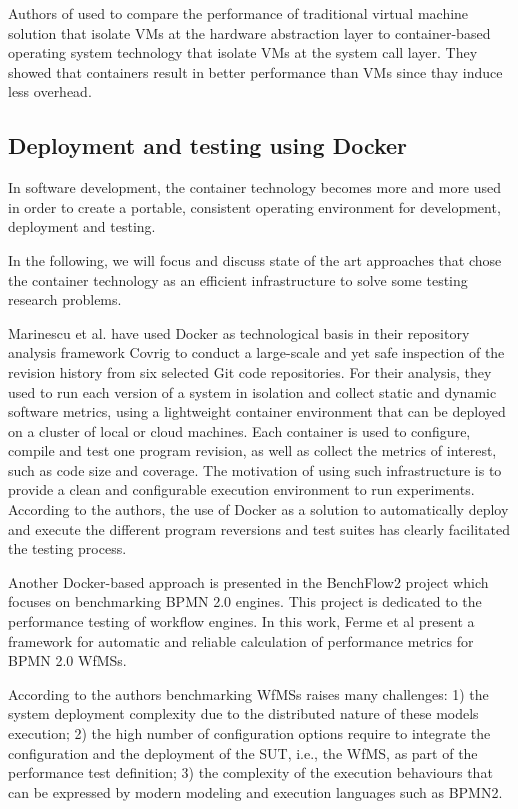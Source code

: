 Authors of \cite{spoiala2016performance,soltesz2007container,merkel2014docker,felter2015updated} used to compare the performance of traditional virtual machine solution that isolate VMs at the hardware abstraction layer to container-based operating system technology that isolate VMs at the system call layer. They showed that containers result in better performance than VMs since thay induce less overhead. 

\subsection{Deployment and testing using Docker}  
In software development, the container technology becomes more and more used in order to create a portable, consistent operating environment for development, deployment and testing.

In the following, we will focus and discuss state of the art approaches that chose the container technology as an efficient infrastructure to solve some testing research problems. 


Marinescu et al.\cite{marinescu2014covrig} have used Docker as technological basis in their repository analysis framework Covrig to conduct a large-scale and yet safe inspection of the revision history from six selected Git code repositories. 
For their analysis, they used to run each version of a system in isolation and collect static and dynamic software metrics, using a lightweight container environment that can be deployed on a cluster of local or cloud machines. Each container is used to configure, compile and test one program revision, as well as collect the metrics of interest, such as code size and coverage.
The motivation of using such infrastructure is to provide a clean and configurable execution environment to run experiments. According to the authors, the use of Docker as a solution to automatically deploy and execute the different program reversions and test suites has clearly facilitated the testing process.


Another Docker-based approach is presented in the BenchFlow2 project which focuses on benchmarking BPMN 2.0 engines\cite{ferme2015framework}. This project is dedicated to the performance testing of workflow engines. In this work, Ferme et al present a framework for automatic and reliable calculation of performance metrics for BPMN 2.0 WfMSs. 

According to the authors benchmarking WfMSs raises many challenges: 1) the system deployment complexity due to the distributed nature of these models execution; 2) the high number of configuration options require to integrate the configuration and the deployment of the SUT, i.e., the WfMS, as part of the performance test definition; 3) the complexity of the execution behaviours that can be expressed by modern modeling and execution languages such as BPMN2.

